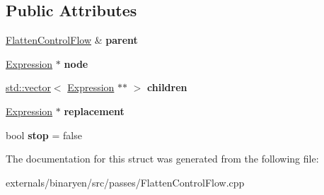 \subsection*{Public Attributes}
\begin{DoxyCompactItemize}
\item 
\mbox{\label{structwasm_1_1_flatten_control_flow_1_1_splitter_adf208baf08c47c3e6b4330582af66366}} 
\mbox{\hyperlink{structwasm_1_1_flatten_control_flow}{Flatten\+Control\+Flow}} \& {\bfseries parent}
\item 
\mbox{\label{structwasm_1_1_flatten_control_flow_1_1_splitter_a49e9224357098c8a636475e42a783673}} 
\mbox{\hyperlink{classwasm_1_1_expression}{Expression}} $\ast$ {\bfseries node}
\item 
\mbox{\label{structwasm_1_1_flatten_control_flow_1_1_splitter_a385096bb6ce22a14d887e75054f272d7}} 
\mbox{\hyperlink{classstd_1_1vector}{std\+::vector}}$<$ \mbox{\hyperlink{classwasm_1_1_expression}{Expression}} $\ast$$\ast$ $>$ {\bfseries children}
\item 
\mbox{\label{structwasm_1_1_flatten_control_flow_1_1_splitter_ac82c40f487601e588f453a5096586130}} 
\mbox{\hyperlink{classwasm_1_1_expression}{Expression}} $\ast$ {\bfseries replacement}
\item 
\mbox{\label{structwasm_1_1_flatten_control_flow_1_1_splitter_a827dc8fd999dfb29f67e8930259b01ae}} 
bool {\bfseries stop} = false
\end{DoxyCompactItemize}


The documentation for this struct was generated from the following file\+:\begin{DoxyCompactItemize}
\item 
externals/binaryen/src/passes/Flatten\+Control\+Flow.\+cpp\end{DoxyCompactItemize}
